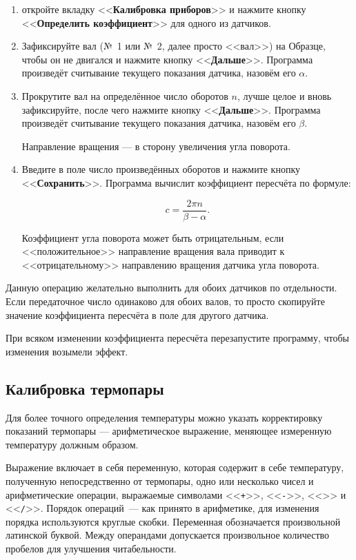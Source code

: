 \documentclass[12pt, a4paper, twocolumn]{report}
\newcommand{\CTL}[1]{<<{\bf #1}>>}
\newcommand{\CMD}[1]{<<{\tt #1}>>}
\begin{document}
\begin{enumerate}
\item откройте вкладку \CTL{Калибровка приборов} и нажмите кнопку \CTL{Определить коэффициент} для одного из датчиков.

\item Зафиксируйте вал (№~1 или №~2, далее просто <<вал>>) на Образце, чтобы он не двигался и нажмите кнопку \CTL{Дальше}. Программа произведёт считывание текущего показания датчика, назовём его $\alpha$.

\item Прокрутите вал на определённое число оборотов $n$, лучше целое и вновь зафиксируйте, после чего нажмите кнопку \CTL{Дальше}. Программа произведёт считывание текущего показания датчика, назовём его $\beta$. 

Направление вращения --- в сторону увеличения угла поворота.

\item Введите в поле число произведённых оборотов и нажмите кнопку \CTL{Сохранить}. Программа вычислит коэффициент пересчёта по формуле:

\begin{equation}
c = \frac{2 \pi n}{ \beta - \alpha }.
\end{equation}

Коэффициент угла поворота может быть отрицательным, если <<положительное>> направление вращения вала приводит к <<отрицательному>> направлению вращения датчика угла поворота.

\end{enumerate}

Данную операцию желательно выполнить для обоих датчиков по отдельности. Если передаточное число одинаково для обоих валов, то просто скопируйте значение коэффициента пересчёта в поле для другого датчика.

При всяком изменении коэффициента пересчёта перезапустите программу, чтобы изменения возымели эффект.

\subsection{Калибровка термопары}

Для более точного определения температуры можно указать корректировку показаний термопары --- арифметическое выражение, меняющее измеренную температуру должным образом.

Выражение включает в себя переменную, которая содержит в себе температуру, полученную непосредственно от термопары, одно или несколько чисел и арифметические операции, выражаемые символами \CMD{+}, \CMD{-}, \CMD{*} и \CMD{/}. Порядок операций~--- как принято в арифметике, для изменения порядка используются круглые скобки. Переменная обозначается произвольной латинской буквой. Между операндами допускается произвольное количество пробелов для улучшения читабельности.
\end{document}

